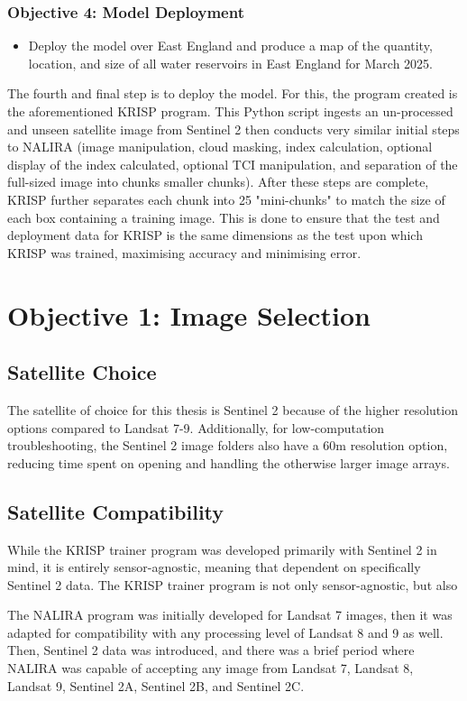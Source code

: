 \subsubsection{Objective 4: Model Deployment}
\begin{itemize}
    \item Deploy the model over East England and produce a map of the quantity, location, and size of all water reservoirs in East England for March 2025. 
\end{itemize}
The fourth and final step is to deploy the model. For this, the program created is the aforementioned KRISP program. This Python script ingests an un-processed and unseen satellite image from Sentinel 2 then conducts very similar initial steps to NALIRA (image manipulation, cloud masking, index calculation, optional display of the index calculated, optional TCI manipulation, and separation of the full-sized image into chunks smaller chunks). After these steps are complete, KRISP further separates each chunk into 25 "mini-chunks" to match the size of each box containing a training image. This is done to ensure that the test and deployment data for KRISP is the same dimensions as the test upon which KRISP was trained, maximising accuracy and minimising error. 

\section{Objective 1: Image Selection}
\subsection{Satellite Choice}
The satellite of choice for this thesis is Sentinel 2 because of the higher resolution options compared to Landsat 7-9. Additionally, for low-computation troubleshooting, the Sentinel 2 image folders also have a 60m resolution option, reducing time spent on opening and handling the otherwise larger image arrays. 

\subsection{Satellite Compatibility}
While the KRISP trainer program was developed primarily with Sentinel 2 in mind, it is entirely sensor-agnostic, meaning that dependent on specifically Sentinel 2 data. The KRISP trainer program is not only sensor-agnostic, but also 

The NALIRA program was initially developed for Landsat 7 images, then it was adapted for compatibility with any processing level of Landsat 8 and 9 as well. Then, Sentinel 2 data was introduced, and there was a brief period where NALIRA was capable of accepting any image from Landsat 7, Landsat 8, Landsat 9, Sentinel 2A, Sentinel 2B, and Sentinel 2C. 

